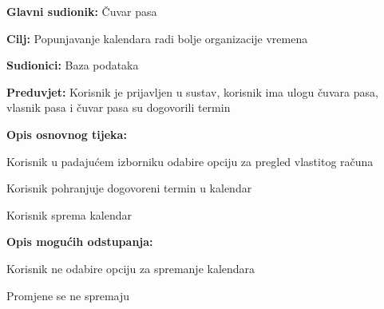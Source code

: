 					\noindent {}	
					\begin{packed_item}
						
						\item \textbf{Glavni sudionik: } Čuvar pasa
						\item  \textbf{Cilj:} Popunjavanje kalendara radi bolje organizacije vremena
						\item  \textbf{Sudionici:} Baza podataka
						\item  \textbf{Preduvjet:} Korisnik je prijavljen u sustav, korisnik ima ulogu čuvara pasa, vlasnik pasa i čuvar pasa su dogovorili termin 
						\item  \textbf{Opis osnovnog tijeka:}
						
						\item[] \begin{packed_enum}
							
							\item Korisnik u padajućem izborniku odabire opciju za pregled vlastitog računa   
							\item Korisnik pohranjuje dogovoreni termin u kalendar
							\item Korisnik sprema kalendar
							
						\end{packed_enum}
						
						\item  \textbf{Opis mogućih odstupanja:}
						
						\item[] \begin{packed_item}
							
							\item[3.a] Korisnik ne odabire opciju za spremanje kalendara
							\item[] \begin{packed_enum}
								
								\item Promjene se ne spremaju
								
							\end{packed_enum}
							
						\end{packed_item}
					\end{packed_item}	
					

